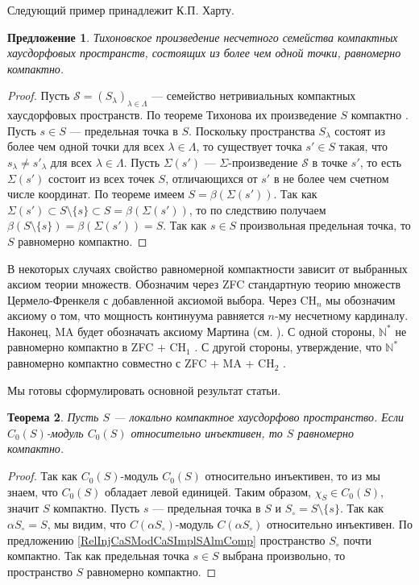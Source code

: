 \documentclass[12pt]{article}
\newtheorem{theorem}{Теорема}[section]
\newtheorem{proposition}[theorem]{Предложение}
\begin{document}
Следующий пример принадлежит К.П. Харту.

\begin{proposition}\label{UcountProdCompSpIsUnifComp} Тихоновское произведение несчетного семейства компактных хаусдорфовых пространств, состоящих из более чем одной точки, равномерно компактно.
\end{proposition}
\begin{proof} Пусть $\mathcal{S}=(S_\lambda)_{\lambda\in\Lambda}$ --- семейство нетривиальных компактных хаусдорфовых пространств. По теореме Тихонова их произведение $S$ компактно \cite[теорема 3.2.4]{EngkingGenTop}. Пусть $s\in S$ --- предельная точка в $S$. Поскольку пространства $S_\lambda$ состоят из более чем одной точки для всех $\lambda\in\Lambda$, то существует точка $s'\in S$ такая, что $s_\lambda\neq s'_\lambda$ для всех $\lambda\in\Lambda$. Пусть $\Sigma(s')$ --- $\Sigma$-произведение $\mathcal{S}$ в точке $s'$, то есть $\Sigma(s')$ состоит из всех точек $S$, отличающихся от $s'$ в не более чем счетном числе координат. По теореме \cite[теорема 3.12.24(c)]{EngkingGenTop} имеем $S=\beta(\Sigma(s'))$. Так как $\Sigma(s')\subset S\setminus\{s\}\subset S=\beta(\Sigma(s'))$, то по следствию \cite[следствие 3.6.9]{EngkingGenTop} получаем $\beta(S\setminus\{s\})=\beta(\Sigma(s'))=S$. Так как $s\in S$ произвольная предельная точка, то $S$ равномерно компактно.
\end{proof}

В некоторых случаях свойство равномерной компактности зависит от выбранных аксиом теории множеств. Обозначим через \textsc{ZFC} стандартную теорию множеств Цермело-Френкеля с добавленной аксиомой выбора. Через \textsc{CH}$_n$ мы обозначим аксиому о том, что мощность континуума равняется $n$-му несчетному кардиналу. Наконец, \textsc{MA} будет обозначать аксиому Мартина (см. \cite{KunSetThIndepPrf}). С одной стороны, $\mathbb{N}^*$ не равномерно компактно в \textsc{ZFC + CH$_1$} \cite{FinGillExtContFuncbN}. С другой стороны, утверждение, что $\mathbb{N}^*$ равномерно компактно совместно с \textsc{ZFC + MA + CH$_2$} \cite{DouKunMillCStarEmbdDenPropSbspStoneRemN}.

Мы готовы сформулировать основной результат статьи.

\begin{theorem}\label{RelInjCSModCSImplUnifCompS} Пусть $S$ --- локально компактное хаусдорфово пространство. Если $C_0(S)$-модуль $C_0(S)$ относительно инъективен, то $S$ равномерно компактно.
\end{theorem}
\begin{proof} Так как $C_0(S)$-модуль $C_0(S)$ относительно инъективен, то из \cite[следствие 2.2.8 (i)]{RamsHomPropSemgroupAlg} мы знаем, что $C_0(S)$ обладает левой единицей. Таким образом, $\chi_S\in C_0(S)$, значит $S$ компактно. Пусть $s$ --- предельная точка в $S$ и $S_\circ=S\setminus\{s\}$. Так как $\alpha S_\circ=S$, мы видим, что $C(\alpha S_\circ)$-модуль $C(\alpha S_\circ)$ относительно инъективен. По предложению \ref{RelInjCaSModCaSImplSAlmComp} пространство $S_\circ$ почти компактно. Так как предельная точка $s\in S$ выбрана произвольно, то пространство $S$ равномерно компактно.
\end{proof}
\end{document}
